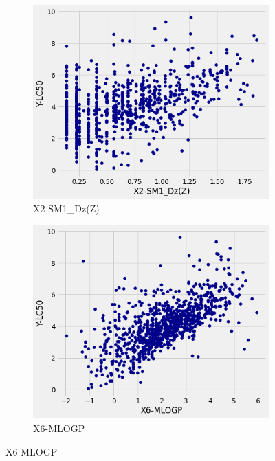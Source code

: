 \documentclass{ueacmpstyle}
\begin{document}
    \begin{figure}[!htb]
    	\centering
        \begin{subfigure}[!htb]{0.25\textwidth}
    	\centering
    	\includegraphics[width=\textwidth]{qsar_x2.png}
    	\caption{X2-SM1\_Dz(Z)}
    	\label{fig2:x2}
    	\end{subfigure}
    	\hfill
    	\begin{subfigure}[!htb]{0.25\textwidth}
		\centering
		\includegraphics[width=\textwidth]{qsar_x6.png}
		\caption{X6-MLOGP}
		\label{fig2:x6}
		\end{subfigure}

\end{figure}
\end{document}

